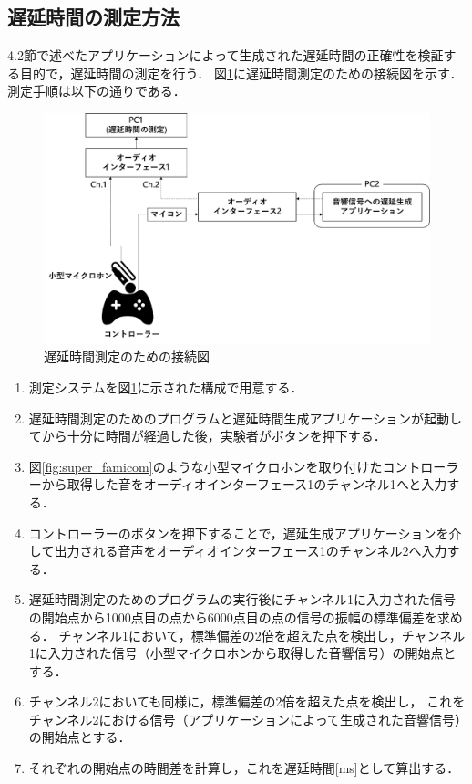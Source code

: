 \subsection{遅延時間の測定方法}
4.2節で述べたアプリケーションによって生成された遅延時間の正確性を検証する目的で，遅延時間の測定を行う．
図\ref{fig:delay_check}に遅延時間測定のための接続図を示す．
測定手順は以下の通りである．
\begin{figure}[tbp]
  \centering
  \includegraphics[scale=0.12]{figures/DelayCheck/DelayCheck_EX.pdf}
  \caption{遅延時間測定のための接続図}
  \label{fig:delay_check}
\end{figure}
\begin{enumerate}[leftmargin=*]
  \item 測定システムを図\ref{fig:delay_check}に示された構成で用意する．
  \item 遅延時間測定のためのプログラムと遅延時間生成アプリケーションが起動してから十分に時間が経過した後，実験者がボタンを押下する．
  \item 図\ref{fig:super_famicom}のような小型マイクロホンを取り付けたコントローラーから取得した音をオーディオインターフェース1のチャンネル1へと入力する．
  \item コントローラーのボタンを押下することで，遅延生成アプリケーションを介して出力される音声をオーディオインターフェース1のチャンネル2へ入力する．
  \item 遅延時間測定のためのプログラムの実行後にチャンネル1に入力された信号の開始点から1000点目の点から6000点目の点の信号の振幅の標準偏差を求める．
  チャンネル1において，標準偏差の2倍を超えた点を検出し，チャンネル1に入力された信号（小型マイクロホンから取得した音響信号）の開始点とする．
  \item チャンネル2においても同様に，標準偏差の2倍を超えた点を検出し，
  これをチャンネル2における信号（アプリケーションによって生成された音響信号）の開始点とする．
  \item それぞれの開始点の時間差を計算し，これを遅延時間[ms]として算出する．
\end{enumerate}
